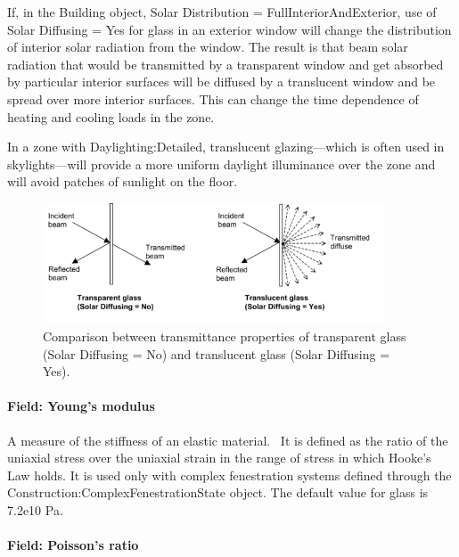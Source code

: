 If, in the Building object, Solar Distribution = FullInteriorAndExterior, use of Solar Diffusing = Yes for glass in an exterior window will change the distribution of interior solar radiation from the window. The result is that beam solar radiation that would be transmitted by a transparent window and get absorbed by particular interior surfaces will be diffused by a translucent window and be spread over more interior surfaces. This can change the time dependence of heating and cooling loads in the zone.

In a zone with Daylighting:Detailed, translucent glazing---which is often used in skylights---will provide a more uniform daylight illuminance over the zone and will avoid patches of sunlight on the floor.

\begin{figure}[hbtp] %
\centering
\includegraphics[width=0.9\textwidth, height=0.9\textheight, keepaspectratio=true]{media/image025.png}
\caption{Comparison between transmittance properties of transparent glass (Solar Diffusing = No) and translucent glass (Solar Diffusing = Yes). \protect \label{fig:comparison-between-transmittance-properties}}
\end{figure}

\paragraph{Field: Young's modulus}\label{field-youngs-modulus}

A measure of the stiffness of an elastic material.~ It is defined as the ratio of the uniaxial stress over the uniaxial strain in the range of stress in which Hooke's Law holds. It is used only with complex fenestration systems defined through the Construction:ComplexFenestrationState object. The default value for glass is 7.2e10 Pa.

\paragraph{Field: Poisson's ratio}\label{field-poissons-ratio}

